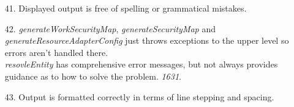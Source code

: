 \begin{itemize}
\item [41.] Displayed output is free of spelling or grammatical mistakes.
\item [42.] \textit{generateWorkSecurityMap}, \textit{generateSecurityMap} and \textit{generateResourceAdapterConfig} just throws exceptions to the upper level so errors aren't handled there.\\
\textit{resovleEntity} has comprehensive error messages, but not always provides guidance as to how to solve the problem. \textit{1631}.
\item [43.] Output is formatted correctly in terms of line stepping and spacing.
\end{itemize}